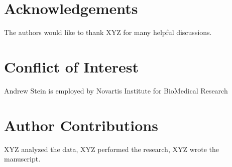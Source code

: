 \documentclass{article}
\begin{document}
\section*{Acknowledgements}
The authors would like to thank XYZ for many helpful discussions.

\section*{Conflict of Interest}
Andrew Stein is employed by Novartis Institute for BioMedical Research

\section*{Author Contributions}
XYZ analyzed the data, XYZ performed the research, XYZ wrote the manuscript.

 



\end{document}
